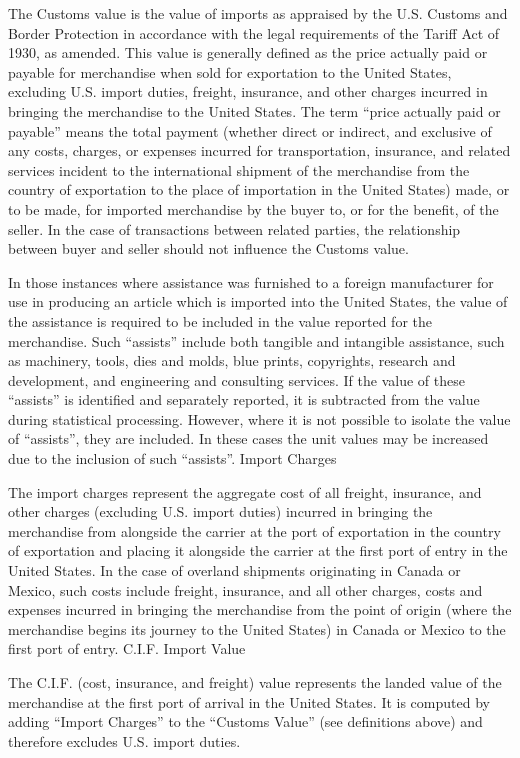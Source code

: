 \documentclass[a4paper,11pt]{article}
\begin{document}
The Customs value is the value of imports as appraised by the U.S. Customs and Border Protection in accordance with the legal requirements of the Tariff Act of 1930, as amended. This value is generally defined as the price actually paid or payable for merchandise when sold for exportation to the United States, excluding U.S. import duties, freight, insurance, and other charges incurred in bringing the merchandise to the United States. The term ``price actually paid or payable'' means the total payment (whether direct or indirect, and exclusive of any costs, charges, or expenses incurred for transportation, insurance, and related services incident to the international shipment of the merchandise from the country of exportation to the place of importation in the United States) made, or to be made, for imported merchandise by the buyer to, or for the benefit, of the seller. In the case of transactions between related parties, the relationship between buyer and seller should not influence the Customs value.

In those instances where assistance was furnished to a foreign manufacturer for use in producing an article which is imported into the United States, the value of the assistance is required to be included in the value reported for the merchandise. Such ``assists'' include both tangible and intangible assistance, such as machinery, tools, dies and molds, blue prints, copyrights, research and development, and engineering and consulting services. If the value of these ``assists'' is identified and separately reported, it is subtracted from the value during statistical processing. However, where it is not possible to isolate the value of ``assists'', they are included. In these cases the unit values may be increased due to the inclusion of such ``assists''.
Import Charges

The import charges represent the aggregate cost of all freight, insurance, and other charges (excluding U.S. import duties) incurred in bringing the merchandise from alongside the carrier at the port of exportation in the country of exportation and placing it alongside the carrier at the first port of entry in the United States. In the case of overland shipments originating in Canada or Mexico, such costs include freight, insurance, and all other charges, costs and expenses incurred in bringing the merchandise from the point of origin (where the merchandise begins its journey to the United States) in Canada or Mexico to the first port of entry.
C.I.F. Import Value

The C.I.F. (cost, insurance, and freight) value represents the landed value of the merchandise at the first port of arrival in the United States. It is computed by adding ``Import Charges'' to the ``Customs Value'' (see definitions above) and therefore excludes U.S. import duties.
\end{document}
